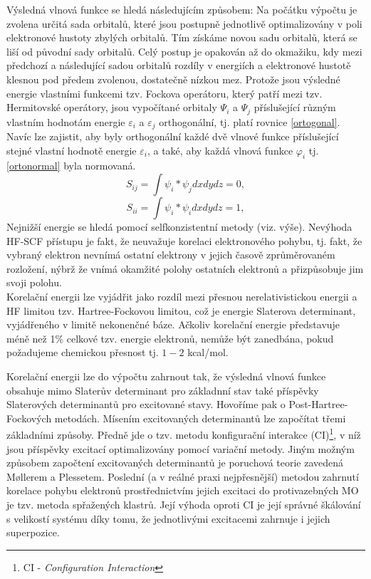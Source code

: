 \documentclass[
  digital, %
  table,   %
  lof,     %
  lot,     %
  oneside,
]{fithesis3}
\begin{document}
Výsledná vlnová funkce se hledá následujícím způsobem: Na počátku výpočtu je zvolena určitá sada orbitalů, které jsou postupně jednotlivě optimalizovány v poli elektronové hustoty zbylých orbitalů. Tím získáme novou sadu orbitalů, která se liší od původní sady orbitalů. Celý postup je opakován až do okmažiku, kdy mezi předchozí a následující sadou orbitalů rozdíly v energiích a elektronové hustotě klesnou pod předem zvolenou, dostatečně nízkou mez. Protože jsou výsledné energie vlastními funkcemi tzv. Fockova operátoru, který patří mezi tzv. Hermitovské operátory, jsou vypočítané orbitaly $\Psi_i$ a $\Psi_j$ příslušející různým vlastním hodnotám energie $\varepsilon_i $ a $\varepsilon_j$ orthogonální, tj. platí rovnice \ref{ortogonal}. Navíc lze zajistit, aby byly orthogonální každé dvě vlnové funkce příslušející stejné vlastní hodnotě energie $\varepsilon_i$, a také, aby každá vlnová funkce $\varphi_i$ tj. \ref{ortonormal} byla normovaná.
 \begin{equation}
S_{ij} = \int \psi_i * \psi_j dx dy dz = 0,
 \label{ortogonal}
 \end{equation}
 \begin{equation}
   S_{ii} = \int \psi_i * \psi_i dx dy dz = 1,
   \label{ortonormal}
 \end{equation}
Nejnižší energie se hledá pomocí selfkonzistentní metody (viz. výše). Nevýhoda HF-SCF přístupu je fakt, že neuvažuje korelaci elektronového pohybu, tj. fakt, že vybraný elektron nevnímá ostatní elektrony v jejich časově zprůměrovaném rozložení, nýbrž že vnímá okamžité polohy ostatních elektronů a přizpůsobuje jim svoji polohu.\\

Korelační energii lze vyjádřit jako rozdíl mezi přesnou nerelativistickou energii a HF limitou tzv. Hartree-Fockovou limitou, což je energie Slaterova determinant, vyjádřeného v limitě nekonenčné báze. Ačkoliv korelační energie představuje méně než 1\% celkové tzv. energie elektronů, nemůže být zanedbána, pokud požadujeme chemickou přesnost tj. $1-2$ kcal/mol.

Korelační energii lze do výpočtu zahrnout tak, že výsledná vlnová funkce obsahuje mimo Slaterův determinant pro základnní stav také příspěvky Slaterových determinantů pro excitované stavy. Hovoříme pak o Post-Hartree-Fockových metodách. Mísením excitovaných determinantů lze započítat třemi základními způsoby. Předně jde o tzv. metodu konfigurační interakce (CI)\footnote{CI - \textit{Configuration Interaction}}, v níž jsou příspěvky excitací optimalizovány pomocí variační metody. Jiným možným způsobem započtení excitovaných determinantů je poruchová teorie zavedená M{\o}llerem a Plessetem. Poslední (a v reálné praxi nejpřesnější) metodou zahrnutí korelace pohybu elektronů prostřednictvím jejich excitaci do protivazebných MO je tzv. metoda spřažených klastrů. Její výhoda oproti CI je její správné škálování s velikostí systému díky tomu, že jednotlivými excitacemi zahrnuje i jejich superpozice.
\end{document}
